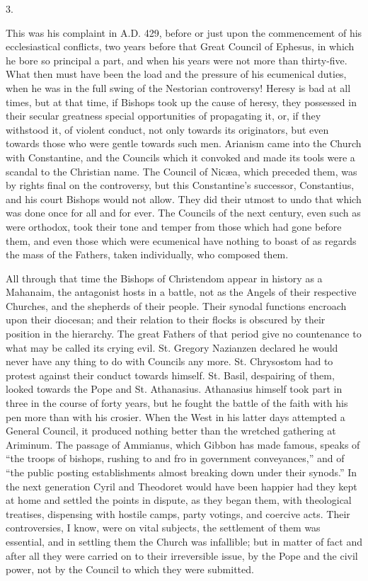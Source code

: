 3.

This was his complaint in A.D. 429, before or
just upon the commencement of his ecclesiastical conflicts, two years
before that Great Council of Ephesus, in which he bore so principal a
part, and when his years were not more than thirty-five. What then
must have been the load and the pressure of his ecumenical duties,
when he was in the full swing of the Nestorian controversy! Heresy is bad at all times, but at that time, if Bishops took up the
cause of heresy, they possessed in their secular greatness special
opportunities of propagating it, or, if they withstood it, of violent
conduct, not only towards its originators, but even towards those who
were gentle towards such men. Arianism came into the Church with
Constantine, and the Councils which it convoked and made its tools
were a scandal to the Christian name. The Council of Nicæa, which
preceded them, was by rights final on the controversy, but this
Constantine's successor, Constantius, and his court Bishops would not
allow. They did their utmost to undo that which was done once for all
and for ever. The Councils of the next century, even such as were
orthodox, took their tone and temper from those which had gone before
them, and even those which were ecumenical have nothing to boast of as
regards the mass of the Fathers, taken individually, who composed
them.

All through that time the Bishops of Christendom appear in history
as a Mahanaim, the antagonist hosts in a battle, not as the Angels of
their respective Churches, and the shepherds of their people. Their
synodal functions encroach upon their diocesan; and their relation to
their flocks is obscured by their position in the hierarchy. The great
Fathers of that period give no countenance to what may be called its
crying evil. St. Gregory Nazianzen declared he would never have any
thing to do with Councils any more. St. Chrysostom had to protest
against their conduct towards himself. St. Basil, despairing of them,
looked towards the Pope and St. Athanasius. Athanasius himself took
part in three in the course of forty years, but he fought the battle
of the faith with his pen more than with his crosier. When the West in
his latter days attempted a General Council, it produced nothing
better than the wretched gathering at Ariminum. The passage of
Ammianus, which Gibbon has made famous, speaks of ``the troops of
bishops, rushing to and fro in government conveyances,'' and of
``the public posting establishments almost breaking down under
their synods.'' In the next generation Cyril and Theodoret would
have been happier had they kept at home and settled the points in
dispute, as they began them, with theological treatises, dispensing
with hostile camps, party votings, and coercive acts. Their
controversies, I know, were on vital subjects, the settlement of them
was essential, and in settling them the Church was infallible; but in
matter of fact and after all they were carried on to their
irreversible issue, by the Pope and the civil power, not by the
Council to which they were submitted.

